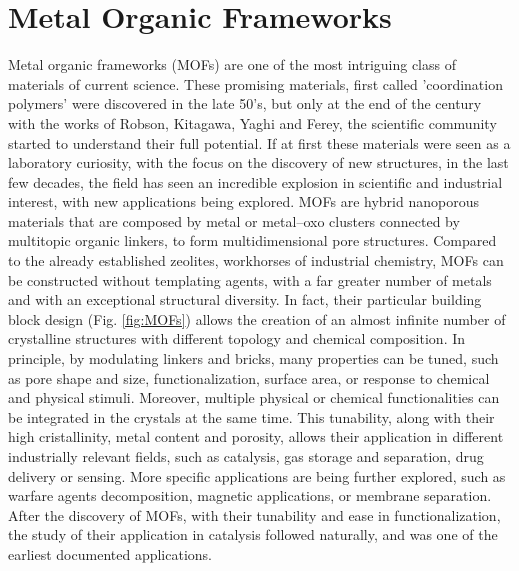 \section{Metal Organic Frameworks}
Metal organic frameworks (MOFs) are one of the most intriguing class of materials of current science. These promising materials, first called 'coordination polymers' were discovered in the late 50's, but only at the end of the century with the works of Robson\cite{batten1995two,hoskins1990design}, Kitagawa\cite{kitagawa1991synthesis, kitagawa1993synthesis}, Yaghi\cite{yaghi1995hydrothermal} and Ferey\cite{riou1998hybrid}, the scientific community started to understand their full potential. If at first these materials were seen as a laboratory curiosity, with the focus on the discovery of new structures, in the last few decades, the field has seen an incredible explosion in scientific and industrial interest, with new applications being explored. MOFs are hybrid nanoporous materials that are composed by metal or metal--oxo clusters connected by multitopic organic linkers, to form multidimensional pore structures. Compared to the already established zeolites, workhorses of industrial chemistry, MOFs can be constructed without templating agents, with a far greater number of metals and with an exceptional structural diversity. In fact, their particular building block design (Fig. \ref{fig:MOFs}) allows the creation of an almost infinite number of crystalline structures with different topology and chemical composition. In principle, by modulating linkers and bricks, many properties can be tuned, such as pore shape and size, functionalization, surface area, or response to chemical and physical stimuli. Moreover, multiple physical or chemical functionalities can be integrated in the crystals at the same time. This tunability, along with their high cristallinity, metal content and porosity, allows their application in different industrially relevant fields, such as catalysis, gas storage and separation, drug delivery or sensing. More specific applications are being further explored, such as warfare agents decomposition, magnetic applications, or membrane separation. After the discovery of MOFs, with their tunability and ease in functionalization, the study of their application in catalysis followed naturally, and was one of the earliest documented applications\cite{Fujita1994}. 
